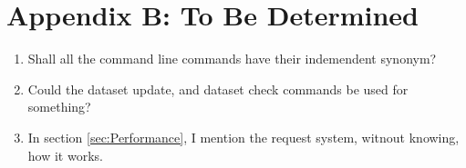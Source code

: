 \documentclass{scrreprt}
\begin{document}
\newpage
\appendix
\chapter*{Appendix B: To Be Determined} \label{app:AppendixB}
\begin{enumerate}
\item Shall all the command line commands have their indemendent synonym?
\item Could the dataset update, and dataset check commands be used for something?
\item In section \ref{sec:Performance}, I mention the request system, witnout knowing, how it works.

\end{enumerate}
\end{document}
